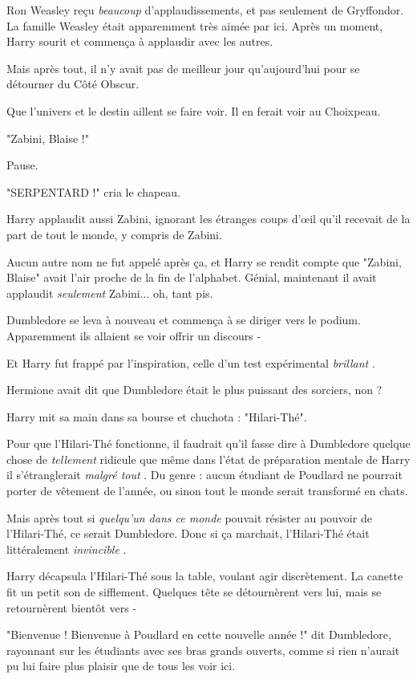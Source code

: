 Ron Weasley reçu \emph{beaucoup}  d'applaudissements, et pas seulement de Gryffondor. La famille Weasley était apparemment très aimée par ici. Après un moment, Harry sourit et commença à applaudir avec les autres.

Mais après tout, il n'y avait pas de meilleur jour qu'aujourd'hui pour se détourner du Côté Obscur.

Que l'univers et le destin aillent se faire voir. Il en ferait voir au Choixpeau.

"Zabini, Blaise !"

Pause.

"SERPENTARD !" cria le chapeau.

Harry applaudit aussi Zabini, ignorant les étranges coups d'œil qu'il recevait de la part de tout le monde, y compris de Zabini.

Aucun autre nom ne fut appelé après ça, et Harry se rendit compte que "Zabini, Blaise" avait l'air proche de la fin de l'alphabet. Génial, maintenant il avait applaudit \emph{seulement}  Zabini... oh, tant pis.

Dumbledore se leva à nouveau et commença à se diriger vers le podium. Apparemment ils allaient se voir offrir un discours -

Et Harry fut frappé par l'inspiration, celle d'un test expérimental \emph{brillant} .

Hermione avait dit que Dumbledore était le plus puissant des sorciers, non ?

Harry mit sa main dans sa bourse et chuchota : "Hilari-Thé".

Pour que l'Hilari-Thé fonctionne, il faudrait qu'il fasse dire à Dumbledore quelque chose de \emph{tellement}  ridicule que même dans l'état de préparation mentale de Harry il s'étranglerait \emph{malgré tout} . Du genre : aucun étudiant de Poudlard ne pourrait porter de vêtement de l'année, ou sinon tout le monde serait transformé en chats.

Mais après tout si \emph{quelqu'un dans ce monde}  pouvait résister au pouvoir de l'Hilari-Thé, ce serait Dumbledore. Donc si ça marchait, l'Hilari-Thé était littéralement \emph{invincible} .

Harry décapsula l'Hilari-Thé sous la table, voulant agir discrètement. La canette fit un petit son de sifflement. Quelques tête se détournèrent vers lui, mais se retournèrent bientôt vers -

"Bienvenue ! Bienvenue à Poudlard en cette nouvelle année !" dit Dumbledore, rayonnant sur les étudiants avec ses bras grands ouverts, comme si rien n'aurait pu lui faire plus plaisir que de tous les voir ici.

